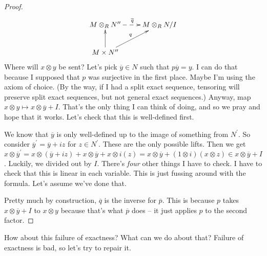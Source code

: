 \begin{enumerate}
\begin{proof}
\begin{equation*}
\xymatrix{M\otimes_R N^{\prime\prime}\ar@{-->}[r]^{\overline{q}} & M\otimes_R N/I\\
M\times N^{\prime\prime}\ar[u]\ar[ur]^q}
\end{equation*}
Where will $x\otimes y$ be sent? Let's pick $\overline{y}\in N$ such that $p\overline{y}=y$. I can do that because I supposed that $p$ was surjective in the first place. Maybe I'm using the axiom of choice. (By the way, if I had a split exact sequence, tensoring will preserve split exact sequences, but not general exact sequences.) Anyway, map $x\otimes y\mapsto x\otimes\overline{y}+I$. That's the only thing I can think of doing, and so we pray and hope that it works. Let's check that this is well-defined first.

We know that $\overline{y}$ is only well-defined up to the image of something from $N^\prime$. So consider $\overline{y}^\prime=\overline{y}+iz$ for $z\in N^\prime$. These are the only possible lifts. Then we get $x\otimes\overline{y}^\prime=x\otimes(\overline{y}+iz)+x\otimes\overline{y}+x\otimes i(z)=x\otimes\overline{y}+(1\otimes i)(x\otimes z)\in x\otimes\overline{y}+I$. Luckily, we divided out by $I$. There's \emph{four} other things I have to check. I have to check that this is linear in each variable. This is just fussing around with the formula. Let's assume we've done that.

Pretty much by construction, $\overline{q}$ is the inverse for $\overline{p}$. This is because $p$ takes $x\otimes\overline{y}+I$ to $x\otimes y$ because that's what $\overline{p}$ does -- it just applies $p$ to the second factor. 
\end{proof}
\end{enumerate}
How about this failure of exactness? What can we do about that? Failure of exactness is bad, so let's try to repair it.

